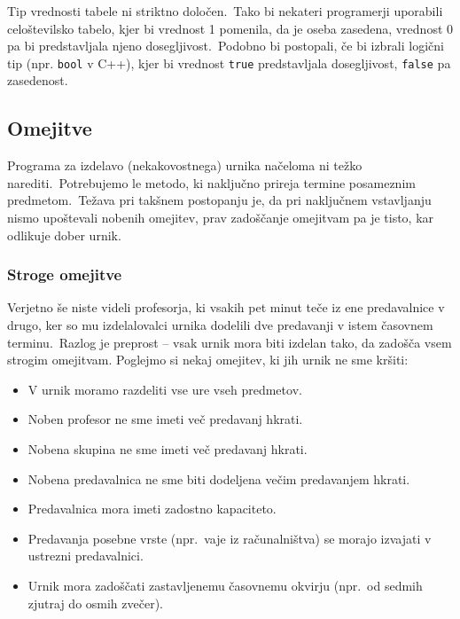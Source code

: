 \documentclass[a4paper,10pt]{article}
\begin{document}
Tip vrednosti tabele ni striktno določen.\ Tako bi nekateri programerji uporabili
celoštevilsko tabelo, kjer bi vrednost 1 pomenila, da je oseba zasedena, vrednost 0
pa bi predstavljala njeno dosegljivost.\ Podobno bi postopali, če bi izbrali logični
tip (npr. \texttt{bool} v C++), kjer bi vrednost \texttt{true} predstavljala
dosegljivost, \texttt{false} pa zasedenost.

\subsection{Omejitve}

Programa za izdelavo (nekakovostnega) urnika načeloma ni težko narediti.\ Potrebujemo
le metodo, ki naključno prireja termine posameznim predmetom.\ Težava pri takšnem postopanju
je, da pri naključnem vstavljanju nismo upoštevali nobenih omejitev, prav zadoščanje omejitvam
pa je tisto, kar odlikuje dober urnik.

\subsubsection{Stroge omejitve}

Verjetno še niste videli profesorja, ki vsakih pet minut teče iz ene predavalnice v drugo,
ker so mu izdelalovalci urnika dodelili dve predavanji v istem časovnem terminu.\ Razlog
je preprost -- vsak urnik mora biti izdelan tako, da zadošča vsem strogim omejitvam.
Poglejmo si nekaj omejitev, ki jih urnik ne sme kršiti:

\begin{itemize}
   \item V urnik moramo razdeliti vse ure vseh predmetov.
  \item Noben profesor ne sme imeti več predavanj hkrati.
  \item Nobena skupina ne sme imeti več predavanj hkrati.
   \item Nobena predavalnica ne sme biti dodeljena večim predavanjem hkrati.
  \item Predavalnica mora imeti zadostno kapaciteto.
   \item Predavanja posebne vrste (npr.\ vaje iz računalništva) se morajo izvajati v ustrezni predavalnici.
   \item Urnik mora zadoščati zastavljenemu časovnemu okvirju (npr.\ od sedmih zjutraj do osmih zvečer).
\end{itemize}
\end{document}
